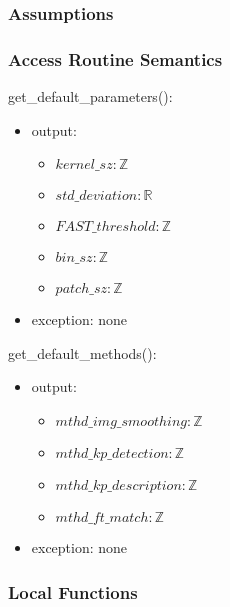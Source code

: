 \documentclass[12pt, titlepage]{article}
\begin{document}

\subsubsection{Assumptions}


\subsubsection{Access Routine Semantics}
\noindent get\_default\_parameters():
\begin{itemize}
\item output:
  \begin{itemize}
  \item $kernel\_sz: \mathbb{Z}$
  \item $std\_deviation: \mathbb{R}$ 
  \item $FAST\_threshold: \mathbb{Z}$ 
  \item $bin\_sz: \mathbb{Z}$ 
  \item $patch\_sz: \mathbb{Z}$ 
  \end{itemize}
  \item exception: none  
\end{itemize}

\noindent get\_default\_methods():
\begin{itemize}
\item output:
  \begin{itemize}
    \item $mthd\_img\_smoothing: \mathbb{Z}$
    \item $mthd\_kp\_detection: \mathbb{Z}$ 
    \item $mthd\_kp\_description: \mathbb{Z}$
    \item $mthd\_ft\_match: \mathbb{Z}$
  \end{itemize}
  \item exception: none 
\end{itemize}

\subsubsection{Local Functions}
\end{document}
